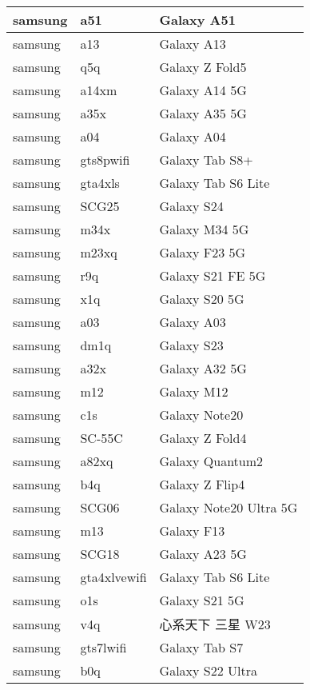 \begin{tabularx}{\linewidth}{|l|X|X|}
        samsung & a51 & Galaxy A51 \\ \hline
        samsung & a13 & Galaxy A13 \\ \hline
        samsung & q5q & Galaxy Z Fold5 \\ \hline
        samsung & a14xm & Galaxy A14 5G \\ \hline
        samsung & a35x & Galaxy A35 5G \\ \hline
        samsung & a04 & Galaxy A04 \\ \hline
        samsung & gts8pwifi & Galaxy Tab S8+ \\ \hline
        samsung & gta4xls & Galaxy Tab S6 Lite \\ \hline
        samsung & SCG25 & Galaxy S24 \\ \hline
        samsung & m34x & Galaxy M34 5G \\ \hline
        samsung & m23xq & Galaxy F23 5G \\ \hline
        samsung & r9q & Galaxy S21 FE 5G \\ \hline
        samsung & x1q & Galaxy S20 5G \\ \hline
        samsung & a03 & Galaxy A03 \\ \hline
        samsung & dm1q & Galaxy S23 \\ \hline
        samsung & a32x & Galaxy A32 5G \\ \hline
        samsung & m12 & Galaxy M12 \\ \hline
        samsung & c1s & Galaxy Note20 \\ \hline
        samsung & SC-55C & Galaxy Z Fold4 \\ \hline
        samsung & a82xq & Galaxy Quantum2 \\ \hline
        samsung & b4q & Galaxy Z Flip4 \\ \hline
        samsung & SCG06 & Galaxy Note20 Ultra 5G \\ \hline
        samsung & m13 & Galaxy F13 \\ \hline
        samsung & SCG18 & Galaxy A23 5G \\ \hline
        samsung & gta4xlvewifi & Galaxy Tab S6 Lite \\ \hline
        samsung & o1s & Galaxy S21 5G \\ \hline
        samsung & v4q & 心系天下 三星 W23 \\ \hline
        samsung & gts7lwifi & Galaxy Tab S7 \\ \hline
        samsung & b0q & Galaxy S22 Ultra \\ \hline

\end{tabularx}
